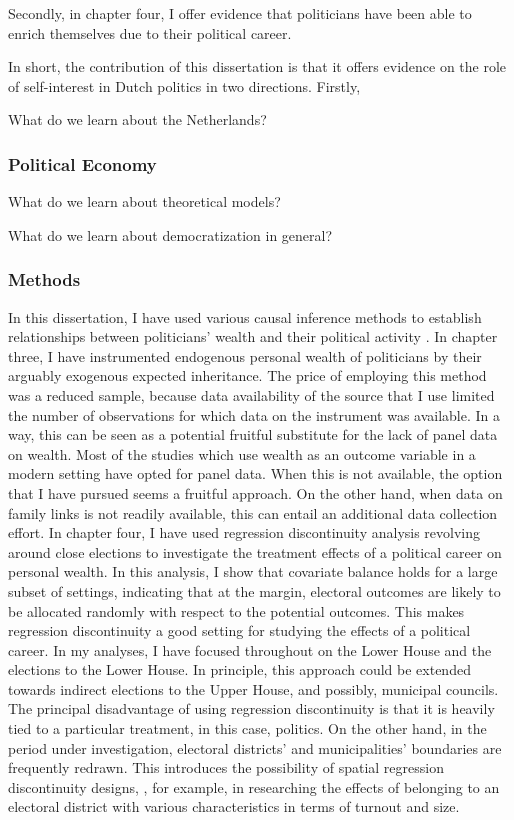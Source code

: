 Secondly, in chapter four, I offer evidence that politicians have been able to enrich themselves due to their political career. 

In short, the contribution of this dissertation is that it offers evidence on the role of self-interest in Dutch politics in two directions. Firstly, 


What do we learn about the Netherlands?

\subsubsection{Political Economy}

What do we learn about theoretical models?

What do we learn about democratization in general?

\subsubsection{Methods}

In this dissertation, I have used various causal inference methods to establish relationships between politicians' wealth and their political activity \citep{cunningham2021causal}. In chapter three, I have instrumented endogenous personal wealth of politicians by their arguably exogenous expected inheritance. The price of employing this method was a reduced sample, because data availability of the source that I use limited the number of observations for which data on the instrument was available. In a way, this can be seen as a potential fruitful substitute for the lack of panel data on wealth. Most of the studies which use wealth as an outcome variable \citep{fisman2014private, berg2020politicians, berg2020returns} in a modern setting have opted for panel data. When this is not available, the option that I have pursued seems a fruitful approach. On the other hand, when data on family links is not readily available, this can entail an additional data collection effort. In chapter four, I have used regression discontinuity analysis revolving around close elections to investigate the treatment effects of a political career on personal wealth. In this analysis, I show that covariate balance holds for a large subset of settings, indicating that at the margin, electoral outcomes are likely to be allocated randomly with respect to the potential outcomes. This makes regression discontinuity a good setting for studying the effects of a political career. In my analyses, I have focused throughout on the Lower House and the elections to the Lower House. In principle, this approach could be extended towards indirect elections to the Upper House, and possibly, municipal councils. The principal disadvantage of using regression discontinuity is that it is heavily tied to a particular treatment, in this case, politics. On the other hand, in the period under investigation, electoral districts' and municipalities' boundaries are frequently redrawn. This introduces the possibility of spatial regression discontinuity designs, \citep[e.g.][]{dell2010persistent, egger2015causal, lowes2021concessions}, for example, in researching the effects of belonging to an electoral district with various characteristics in terms of turnout and size. 

